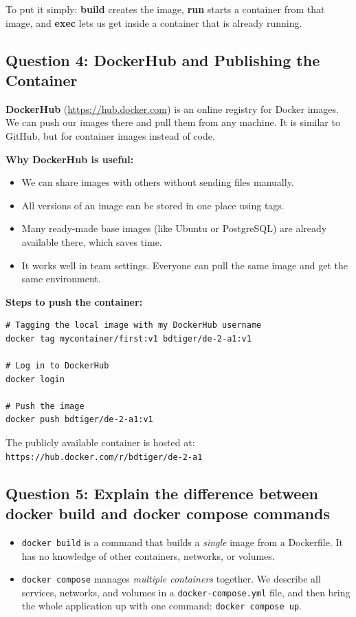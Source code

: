 \documentclass[11pt,a4paper]{article}
\begin{document}
To put it simply: \textbf{build} creates the image, \textbf{run} starts a
container from that image, and \textbf{exec} lets us get inside a container
that is already running.

\subsection{Question 4: DockerHub and Publishing the Container}

\textbf{DockerHub} (\url{https://hub.docker.com}) is an online registry for
Docker images. We can push our images there and pull them from any machine.
It is similar to GitHub, but for container images instead of code.

\textbf{Why DockerHub is useful:}
\begin{itemize}[leftmargin=1.5cm]
  \item We can share images with others without sending files manually.
  \item All versions of an image can be stored in one place using tags.
  \item Many ready-made base images (like Ubuntu or PostgreSQL) are already
        available there, which saves time.
  \item It works well in team settings. Everyone can pull the same image
        and get the same environment.
\end{itemize}

\textbf{Steps to push the container:}
\begin{lstlisting}[style=shell]
# Tagging the local image with my DockerHub username
docker tag mycontainer/first:v1 bdtiger/de-2-a1:v1

# Log in to DockerHub
docker login

# Push the image
docker push bdtiger/de-2-a1:v1
\end{lstlisting}

The publicly available container is hosted at:\\
\texttt{https://hub.docker.com/r/bdtiger/de-2-a1}

\subsection{Question 5: Explain the difference between docker build and docker compose commands}

\begin{itemize}[leftmargin=1.5cm]
  \item \texttt{docker build} is a command that builds a
        \emph{single} image from a Dockerfile. It has no knowledge of other
        containers, networks, or volumes.

  \item \texttt{docker compose} manages
        \emph{multiple containers} together. We describe all services,
        networks, and volumes in a \texttt{docker-compose.yml} file, and then
        bring the whole application up with one command:
        \texttt{docker compose up}.
\end{itemize}
\end{document}
